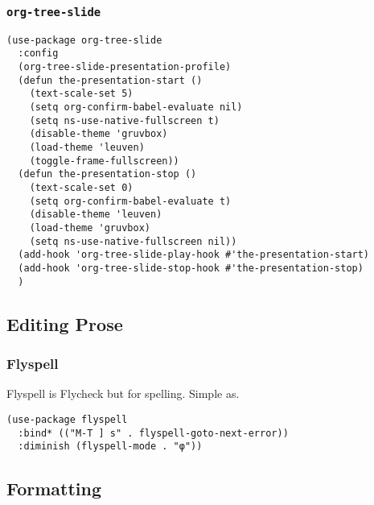 \documentclass[11pt]{article}
\begin{document}
\subsubsection{\texttt{org-tree-slide}}
\label{sec:orgdfd6f7e}
\begin{verbatim}
(use-package org-tree-slide
  :config
  (org-tree-slide-presentation-profile)
  (defun the-presentation-start ()
    (text-scale-set 5)
    (setq org-confirm-babel-evaluate nil)
    (setq ns-use-native-fullscreen t)
    (disable-theme 'gruvbox)
    (load-theme 'leuven)
    (toggle-frame-fullscreen))
  (defun the-presentation-stop ()
    (text-scale-set 0)
    (setq org-confirm-babel-evaluate t)
    (disable-theme 'leuven)
    (load-theme 'gruvbox)
    (setq ns-use-native-fullscreen nil))
  (add-hook 'org-tree-slide-play-hook #'the-presentation-start)
  (add-hook 'org-tree-slide-stop-hook #'the-presentation-stop)
  )
\end{verbatim}
\subsection{Editing Prose}
\label{sec:orgd3c4f76}
\subsubsection{Flyspell}
\label{sec:org565d477}
Flyspell is Flycheck but for spelling. Simple as.
\begin{verbatim}
(use-package flyspell
  :bind* (("M-T ] s" . flyspell-goto-next-error))
  :diminish (flyspell-mode . "φ"))
\end{verbatim}
\subsection{Formatting}
\label{sec:orgc8ccd53}
\end{document}
